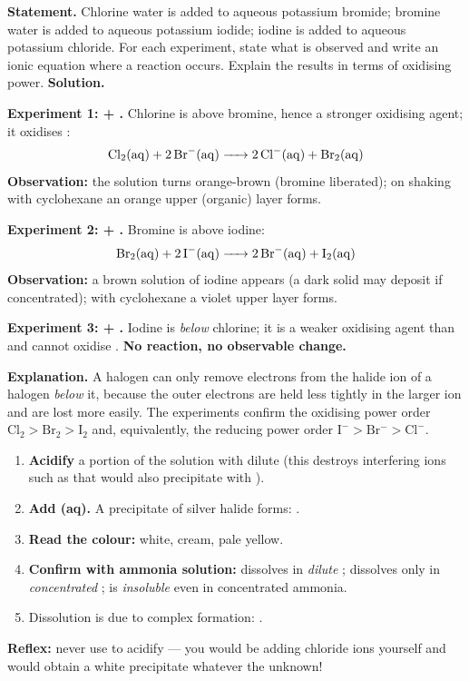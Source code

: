 \documentclass[11pt]{article}
\newcounter{popsec}
\newcounter{popsub}
\newcommand{\courssub}[1]{%
  \stepcounter{popsub}%
  \par\vspace{9pt}\noindent{\popxbold\fontsize{11.5}{13}\selectfont\color{popink}{\color{poporange}\thepopsec.\thepopsub}\hspace{6pt}#1}\par\nopagebreak\vspace{4pt}
}
\begin{document}
\begin{exoresolu}
\textbf{Statement.} Chlorine water is added to aqueous potassium bromide; bromine water is added to aqueous potassium iodide; iodine is added to aqueous potassium chloride. For each experiment, state what is observed and write an ionic equation where a reaction occurs. Explain the results in terms of oxidising power.
\tcblower
\textbf{Solution.}

\textbf{Experiment 1:  + .} Chlorine is above bromine, hence a stronger oxidising agent; it oxidises :
\[ \ce{Cl2(aq) + 2Br-(aq) -> 2Cl-(aq) + Br2(aq)} \]
\textbf{Observation:} the solution turns orange-brown (bromine liberated); on shaking with cyclohexane an orange upper (organic) layer forms.

\textbf{Experiment 2:  + .} Bromine is above iodine:
\[ \ce{Br2(aq) + 2I-(aq) -> 2Br-(aq) + I2(aq)} \]
\textbf{Observation:} a brown solution of iodine appears (a dark solid may deposit if concentrated); with cyclohexane a violet upper layer forms.

\textbf{Experiment 3:  + .} Iodine is \emph{below} chlorine; it is a weaker oxidising agent than  and cannot oxidise . \textbf{No reaction, no observable change.}

\textbf{Explanation.} A halogen can only remove electrons from the halide ion of a halogen \emph{below} it, because the outer electrons are held less tightly in the larger ion and are lost more easily. The experiments confirm the oxidising power order \ensuremath{\mathrm{Cl_{2} > Br_{2} > I_{2}}} and, equivalently, the reducing power order \ensuremath{\mathrm{I^{-} > Br^{-} > Cl^{-}}}.
\end{exoresolu}

\courssub{Method 3: Testing for halide ions}

\begin{methode}
\begin{enumerate}
\item \textbf{Acidify} a portion of the solution with dilute  (this destroys interfering ions such as  that would also precipitate with ).
\item \textbf{Add (aq).} A precipitate of silver halide forms: .
\item \textbf{Read the colour:}  white,  cream,  pale yellow.
\item \textbf{Confirm with ammonia solution:}  dissolves in \emph{dilute} ;  dissolves only in \emph{concentrated} ;  is \emph{insoluble} even in concentrated ammonia.
\item Dissolution is due to complex formation: .
\end{enumerate}
\textbf{Reflex:} never use  to acidify — you would be adding chloride ions yourself and would obtain a white precipitate whatever the unknown!
\end{methode}
\end{document}
